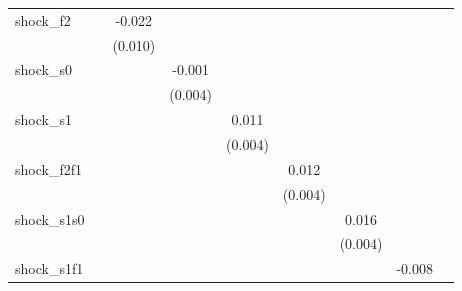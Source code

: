 {\begin{tabular}{l*{8}{c}}
\addlinespace
shock\_f2    &                     &      -0.022\sym{**} &                     &                     &                     &                     &                     &                     \\
            &                     &     (0.010)         &                     &                     &                     &                     &                     &                     \\
\addlinespace
shock\_s0    &                     &                     &      -0.001         &                     &                     &                     &                     &                     \\
            &                     &                     &     (0.004)         &                     &                     &                     &                     &                     \\
\addlinespace
shock\_s1    &                     &                     &                     &       0.011\sym{**} &                     &                     &                     &                     \\
            &                     &                     &                     &     (0.004)         &                     &                     &                     &                     \\
\addlinespace
shock\_f2f1  &                     &                     &                     &                     &       0.012\sym{***}&                     &                     &                     \\
            &                     &                     &                     &                     &     (0.004)         &                     &                     &                     \\
\addlinespace
shock\_s1s0  &                     &                     &                     &                     &                     &       0.016\sym{***}&                     &                     \\
            &                     &                     &                     &                     &                     &     (0.004)         &                     &                     \\
\addlinespace
shock\_s1f1  &                     &                     &                     &                     &                     &                     &      -0.008         &                     \\

\end{tabular}}
